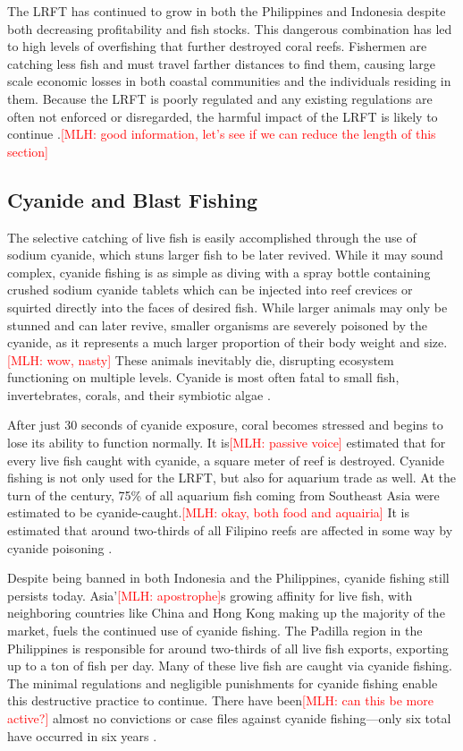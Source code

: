 \documentclass{book}\usepackage{knitr}
\newcommand{\red}[1]{\textcolor{red}{[MLH: #1]}}
\begin{document}
\begin{knitrout}
\begin{kframe}
{The LRFT has continued to grow in both the Philippines and Indonesia despite both decreasing profitability and fish stocks. This dangerous combination has led to high levels of overfishing that further destroyed coral reefs. Fishermen are catching less fish and must travel farther distances to find them, causing large scale economic losses in both coastal communities and the individuals residing in them. Because the LRFT is poorly regulated and any existing regulations are often not enforced or disregarded, the harmful impact of the LRFT is likely to continue \citep{10.2307/40603032}.\red{good information, let's see if we can reduce the length of this section}

\subsection{Cyanide and Blast Fishing}

The selective catching of live fish is easily accomplished through the use of sodium cyanide, which stuns larger fish to be later revived. While it may sound complex, cyanide fishing is as simple as diving with a spray bottle containing crushed sodium cyanide tablets which can be injected into reef crevices or squirted directly into the faces of desired fish. While larger animals may only be stunned and can later revive, smaller organisms are severely poisoned by the cyanide, as it represents a much larger proportion of their body weight and size.\red{wow, nasty} These animals inevitably die, disrupting ecosystem functioning on multiple levels. Cyanide is most often fatal to small fish, invertebrates, corals, and their symbiotic algae \citep{wwfcyanide}.

	After just 30 seconds of cyanide exposure, coral becomes stressed and begins to lose its ability to function normally. It is\red{passive voice} estimated that for every live fish caught with cyanide, a square meter of reef is destroyed. Cyanide fishing is not only used for the LRFT, but also for aquarium trade as well. At the turn of the century, 75\% of all aquarium fish coming from Southeast Asia were estimated to be cyanide-caught.\red{okay, both food and aquairia} It is estimated that around two-thirds of all Filipino reefs are affected in some way by cyanide poisoning \citep{970313024119970301}.

Despite being banned in both Indonesia and the Philippines, cyanide fishing still persists today. Asia’\red{apostrophe}s growing affinity for live fish, with neighboring countries like China and Hong Kong making up the majority of the market, fuels the continued use of cyanide fishing. The Padilla region in the Philippines is responsible for around two-thirds of all live fish exports, exporting up to a ton of fish per day. Many of these live fish are caught via cyanide fishing. The minimal regulations and negligible punishments for cyanide fishing enable this destructive practice to continue. There have been\red{can this be more active?} almost no convictions or case files against cyanide fishing—only six total have occurred in six years \citep{wwfcyanide}.

}
\end{kframe}
\end{knitrout}
\end{document}
